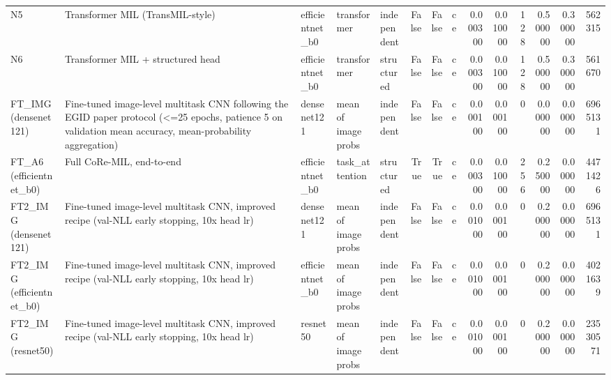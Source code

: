 \begin{table}
\begin{tabular}{lllllrrlrrrrrr}
N5 & Transformer MIL (TransMIL-style) & efficientnet\_b0 & transformer & independent & False & False & ce & 0.000300 & 0.010000 & 128 & 0.500000 & 0.300000 & 562315 \\
N6 & Transformer MIL + structured head & efficientnet\_b0 & transformer & structured & False & False & ce & 0.000300 & 0.010000 & 128 & 0.500000 & 0.300000 & 561670 \\
FT\_IMG (densenet121) & Fine-tuned image-level multitask CNN following the EGID paper protocol (<=25 epochs, patience 5 on validation mean accuracy, mean-probability aggregation) & densenet121 & mean of image probs & independent & False & False & ce & 0.000100 & 0.000100 & 0 & 0.000000 & 0.000000 & 6965131 \\
FT\_A6 (efficientnet\_b0) & Full CoRe-MIL, end-to-end & efficientnet\_b0 & task\_attention & structured & True & True & ce & 0.000300 & 0.010000 & 256 & 0.250000 & 0.000000 & 4471426 \\
FT2\_IMG (densenet121) & Fine-tuned image-level multitask CNN, improved recipe (val-NLL early stopping, 10x head lr) & densenet121 & mean of image probs & independent & False & False & ce & 0.001000 & 0.000100 & 0 & 0.200000 & 0.000000 & 6965131 \\
FT2\_IMG (efficientnet\_b0) & Fine-tuned image-level multitask CNN, improved recipe (val-NLL early stopping, 10x head lr) & efficientnet\_b0 & mean of image probs & independent & False & False & ce & 0.001000 & 0.000100 & 0 & 0.200000 & 0.000000 & 4021639 \\
FT2\_IMG (resnet50) & Fine-tuned image-level multitask CNN, improved recipe (val-NLL early stopping, 10x head lr) & resnet50 & mean of image probs & independent & False & False & ce & 0.001000 & 0.000100 & 0 & 0.200000 & 0.000000 & 23530571 \\
\bottomrule
\end{tabular}
\end{table}
